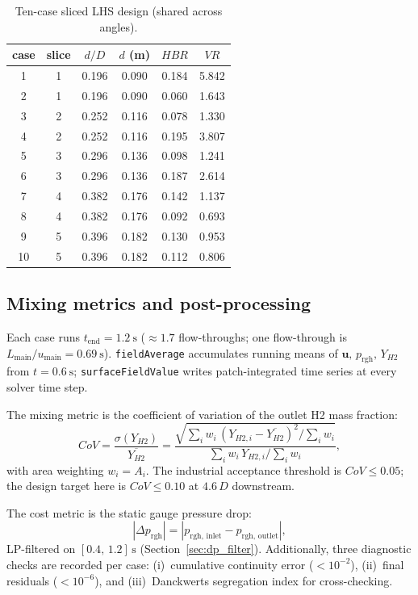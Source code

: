 \documentclass[10pt,a4paper]{article}
\def\Hi{H2}%
\def\dD{d/D}%
\def\VR{VR}%
\def\HBR{HBR}%
\def\CoV{CoV}%
\newcommand{\Hi}{\ensuremath{\mathrm{H_2}}}
\newcommand{\dD}{\ensuremath{d/D}}
\newcommand{\VR}{\ensuremath{\mathrm{VR}}}
\newcommand{\HBR}{\ensuremath{\mathrm{HBR}}}
\newcommand{\CoV}{\ensuremath{\mathrm{CoV}}}
\begin{document}
\begin{table}[H]
\centering\scriptsize
\caption{Ten-case sliced LHS design (shared across angles).}
\label{tab:doe_design}
\begin{tabular}{cccccc}
\toprule
case & slice & \(\dD\) & \(d\) (m) & \(\HBR\) & \(\VR\) \\
\midrule
1 & 1 & 0.196 & 0.090 & 0.184 & 5.842 \\
2 & 1 & 0.196 & 0.090 & 0.060 & 1.643 \\
3 & 2 & 0.252 & 0.116 & 0.078 & 1.330 \\
4 & 2 & 0.252 & 0.116 & 0.195 & 3.807 \\
5 & 3 & 0.296 & 0.136 & 0.098 & 1.241 \\
6 & 3 & 0.296 & 0.136 & 0.187 & 2.614 \\
7 & 4 & 0.382 & 0.176 & 0.142 & 1.137 \\
8 & 4 & 0.382 & 0.176 & 0.092 & 0.693 \\
9 & 5 & 0.396 & 0.182 & 0.130 & 0.953 \\
10 & 5 & 0.396 & 0.182 & 0.112 & 0.806 \\
\bottomrule
\end{tabular}
\end{table}

\subsection{Mixing metrics and post-processing}
\label{sec:method_metrics}
Each case runs \(t_{\mathrm{end}}=\SI{1.2}{\second}\)
(\(\approx\!1.7\) flow-throughs; one flow-through is
\(L_{\mathrm{main}}/u_{\mathrm{main}}=\SI{0.69}{\second}\)).
\texttt{fieldAverage} accumulates running means of
\(\mathbf{u},\,p_{\mathrm{rgh}},\,Y_{\Hi}\) from
\(t=\SI{0.6}{\second}\); \texttt{surfaceFieldValue} writes
patch-integrated time series at every solver time step.

The mixing metric is the coefficient of variation of the outlet
\Hi{} mass fraction:
\begin{equation}
\CoV = \frac{\sigma(Y_{\Hi})}{\overline{Y_{\Hi}}}
= \frac{\sqrt{\sum_i w_i\,(Y_{\Hi,i}-\overline{Y_{\Hi}})^2
  / \sum_i w_i}}{\sum_i w_i\,Y_{\Hi,i}/\sum_i w_i},
\label{eq:cov}
\end{equation}
with area weighting \(w_i=A_i\).
The industrial acceptance threshold is \(\CoV\le 0.05\); the
design target here is \(\CoV\le 0.10\) at \(4.6\,D\) downstream.

The cost metric is the static gauge pressure drop:
\begin{equation}
|\Delta p_{\mathrm{rgh}}| = |p_{\mathrm{rgh,\,inlet}} -
p_{\mathrm{rgh,\,outlet}}|,
\label{eq:dp}
\end{equation}
LP-filtered on \([0.4,\,1.2]\,\si{\second}\)
(Section~\ref{sec:dp_filter}).
Additionally, three diagnostic checks are recorded per case:
(i)~cumulative continuity error (\(<10^{-2}\)),
(ii)~final residuals (\(<10^{-6}\)), and
(iii)~Danckwerts segregation index for cross-checking.
\end{document}

